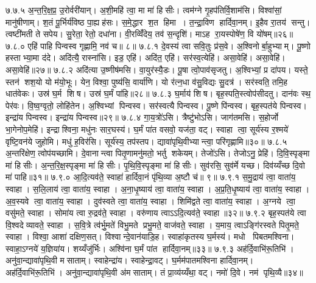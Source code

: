 ७.७.५
अ॒न्त॒रि॒क्ष॒प्र॒ उ॒रोर्वरी॑यान्। अ॒शी॒महि॑ त्वा॒ मा मा॑ हिसीः। त्वम॑ग्ने गृ॒हप॑तिर्वि॒शाम॑सि। विश्वा॑सां॒ मानु॑षीणाम्। श॒तं पू॒र्भिर्य॑विष्ठ पा॒ह्यह॑सः। स॒मे॒द्धार श॒त हिमा। त॒न्द्रा॒विण हार्दिवा॒नम्। इ॒हैव रा॒तय॑ सन्तु। त्वष्टी॑मती ते सपेय। सु॒रेता॒ रेतो॒ दधा॑ना। वी॒रव्विँ॑देय॒ तव॑ स॒न्दृशि॑। माऽह रा॒यस्पोषे॑ण॒ वि यो॑षम्॥२६॥
७.८.०
एहि॑ पाहि पिन्वस्व गृह्णामि॒ नव॑ च॥ ८॥
\anuvakamend
७.८.१
दे॒वस्य॑ त्वा सवि॒तुः प्र॑स॒वे। अ॒श्विनोर्बा॒हुभ्याम्। पू॒ष्णो हस्ताभ्या॒मा द॑दे। अदि॑त्यै॒ रास्ना॑सि। इड॒ एहि॑। अदि॑त॒ एहि॑। सर॑स्व॒त्येहि॑। असा॒वेहि॑। असा॒वेहि॑। असा॒वेहि॑॥२७॥
७.८.२
अदि॑त्या उ॒ष्णीष॑मसि। वा॒युर॑स्यै॒डः। पू॒षा त्वो॒पाव॑सृजतु। अ॒श्विभ्यां॒ प्र दा॑पय। यस्ते॒ स्तन॑ शश॒यो यो म॑यो॒भूः। येन॒ विश्वा॒ पुष्य॑सि॒ वार्या॑णि। यो र॑त्न॒धा व॑सु॒विद्यः सु॒दत्र॑। सर॑स्वति॒ तमि॒ह धात॑वेकः। उस्र॑ घ॒र्म शिष। उस्र॑ घ॒र्मं पा॑हि॥२८॥
७.८.३
घ॒र्माय॑ शिष। बृह॒स्पति॒स्त्वोप॑सीदतु। दान॑वः स्थ॒ पेर॑वः। वि॒ष्व॒ग्वृतो॒ लोहि॑तेन। अ॒श्विभ्यां पिन्वस्व। सर॑स्वत्यै पिन्वस्व। पू॒ष्णे पि॑न्वस्व। बृह॒स्पत॑ये पिन्वस्व। इन्द्रा॑य पिन्वस्व। इन्द्रा॑य पिन्वस्व॥२९॥
७.८.४
गा॒य॒त्रो॑ऽसि। त्रैष्टु॑भोऽसि। जाग॑तमसि। स॒होर्जो भा॒गेनोप॒मेहि॑। इन्द्राश्विना॒ मधु॑नः सार॒घस्य॑। घ॒र्मं पा॑त वसवो॒ यज॑ता॒ वट्। स्वाहा त्वा॒ सूर्य॑स्य र॒श्मये॑ वृष्टि॒वन॑ये जुहोमि। मधु॑ ह॒विर॑सि। सूर्य॑स्य॒ तप॑स्तप। द्यावा॑पृथि॒वीभ्यान्त्वा॒ परि॑गृह्णामि॥३०॥
७.८.५
अ॒न्तरि॑क्षेण॒ त्वोप॑यच्छामि। दे॒वानान्त्वा पितृ॒णामनु॑मतो॒ भर्तु शकेयम्। तेजो॑ऽसि। तेजोऽनु॒ प्रेहि॑। दि॒वि॒स्पृङ्मा मा॑ हिसीः। अ॒न्त॒रि॒क्ष॒स्पृङ्मा मा॑ हिसीः। पृ॒थि॒वि॒स्पृङ्मा मा॑ हिसीः। सुव॑रसि॒ सुव॑र्मे यच्छ। दिव॑य्यँच्छ दि॒वो मा॑ पाहि॥३१॥
७.९.०
आ॒दि॒त्यव॑ते॒ स्वाहा॑ हार्दिवा॒नं पृ॑थि॒व्या अ॒ष्टौ च॑॥ ९॥
\anuvakamend
७.९.१
स॒मु॒द्राय॑ त्वा॒ वाता॑य॒ स्वाहा। स॒लि॒लाय॑ त्वा॒ वाता॑य॒ स्वाहा। अ॒ना॒धृ॒ष्याय॑ त्वा॒ वाता॑य॒ स्वाहा। अ॒प्र॒ति॒धृ॒ष्याय॑ त्वा॒ वाता॑य॒ स्वाहा। अ॒व॒स्यवे त्वा॒ वाता॑य॒ स्वाहा। दुव॑स्वते त्वा॒ वाता॑य॒ स्वाहा। शिमि॑द्वते त्वा॒ वाता॑य॒ स्वाहा। अ॒ग्नये त्वा॒ वसु॑मते॒ स्वाहा। सोमा॑य त्वा रु॒द्रव॑ते॒ स्वाहा। वरु॑णाय त्वाऽऽदि॒त्यव॑ते॒ स्वाहा॥३२॥
७.९.२
बृह॒स्पत॑ये त्वा वि॒श्वदेव्यावते॒ स्वाहा। स॒वि॒त्रे त्व॑र्भु॒मते॑ विभु॒मते प्रभु॒मते॒ वाज॑वते॒ स्वाहा। य॒माय॒ त्वाऽङ्गि॑रस्वते पितृ॒मते॒ स्वाहा। विश्वा॒ आशा॑ दक्षिण॒सत्। विश्वान्दे॒वान॑याडि॒ह। स्वाहा॑कृतस्य घ॒र्मस्य॑। मधो पिबतमश्विना। स्वाहा॒ऽग्नये॑ य॒ज्ञिया॑य। शय्यँजु॑र्भिः। अश्वि॑ना घ॒र्मं पा॑त हार्दिवा॒नम्॥३३॥
७.९.३
अह॑र्दि॒वाभि॑रू॒तिभि॑। अनु॑वा॒न्द्यावा॑पृथि॒वी मसाताम्। स्वाहेन्द्रा॑य। स्वाहेन्द्रा॒वट्। घ॒र्मम॑पातमश्विना हार्दिवा॒नम्। अह॑र्दि॒वाभि॑रू॒तिभि॑। अनु॑वा॒न्द्यावा॑पृथि॒वी अ॑मसाताम्। तं प्रा॒व्य॑य्यँथा॒ वट्। नमो॑ दि॒वे। नम॑ पृथि॒व्यै॥३४॥
